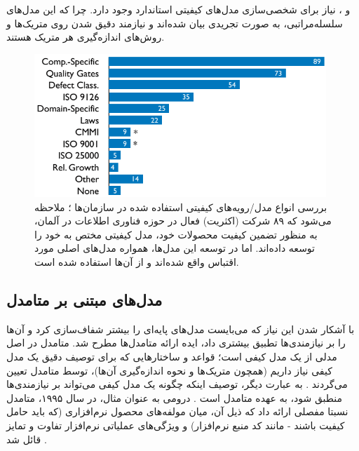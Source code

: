 \cite{pressman_software_2015} و
\cite{sommerville_software_2016}،
نیاز برای شخصی‌سازی مدل‌های کیفیتی استاندارد وجود دارد. چرا که این مدل‌های سلسله‌مراتبی، به صورت تجریدی بیان شده‌اند و نیازمند دقیق شدن روی متریک‌ها و روش‌های اندازه‌گیری هر متریک هستند.
\begin{figure}[H]
	\centering\includegraphics[width=11cm]{Resources/wagner.PNG}
	\caption[بررسی انواع مدل‌ها/رویه‌های کیفیتی استفاده شده در سازمان‌ها]
	{بررسی انواع مدل/رویه‌های کیفیتی استفاده شده در سازمان‌ها
		\cite{wagner_software_2012}؛
		ملاحظه می‌شود که ۸۹ شرکت (اکثریت) فعال در حوزه فناوری اطلاعات در آلمان، به منظور تضمین کیفیت محصولات خود، مدل کیفیتی مختص به خود را توسعه داده‌اند. اما در توسعه این مدل‌ها، همواره مدل‌های اصلی مورد اقتباس واقع شده‌اند و از آن‌ها استفاده شده است.
	}
	\label{fig:wagner}
\end{figure}
\subsection{مدل‌های مبتنی بر متامدل}
با آشکار شدن این نیاز که می‌بایست مدل‌های پایه‌ای را بیشتر شفاف‌سازی کرد و آن‌ها را بر نیازمندی‌ها تطبیق بیشتری داد، ایده ارائه متامدل‌ها مطرح شد. متامدل در اصل مدلی از یک مدل کیفی است؛ قواعد و ساختارهایی که برای توصیف دقیق یک مدل کیفی نیاز داریم (همچون متریک‌ها و نحوه اندازه‌گیری آن‌ها)، توسط متامدل تعیین می‌گردند
\cite{deissenboeck_software_2009}.
به عبارت دیگر، توصیف اینکه چگونه یک مدل کیفی می‌تواند بر نیازمندی‌ها منطبق شود، به عهده متامدل است
\cite{wagner_software_2013}.
درومی به عنوان مثال، در سال ۱۹۹۵، متامدل نسبتا مفصلی ارائه داد که ذیل آن، میان مولفه‌های محصول نرم‌افزاری (که باید حامل کیفیت باشند - مانند کد منبع نرم‌افزار) و ویژگی‌های عملیاتی نرم‌افزار تفاوت و تمایز قائل شد
\cite{dromey_model_1995}.
